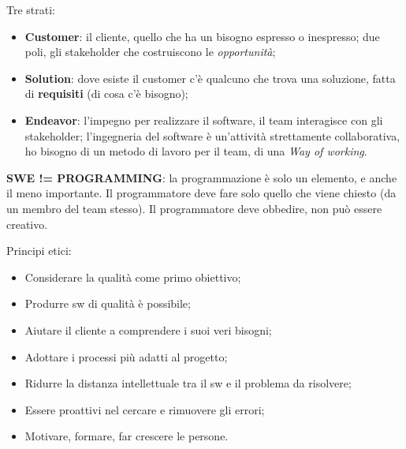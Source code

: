Tre strati:

\begin{itemize}

	\item \textbf{Customer}: il cliente, quello che ha un bisogno espresso o inespresso; due poli, gli stakeholder che costruiscono le \textit{opportunità};
	\item \textbf{Solution}: dove esiste il customer c'è qualcuno che trova una soluzione, fatta di \textbf{requisiti} (di cosa c'è bisogno);
	\item \textbf{Endeavor}: l'impegno per realizzare il software, il team interagisce con gli stakeholder; l'ingegneria del software è un'attività strettamente collaborativa, ho bisogno di un metodo di lavoro per il team, di una \textit{Way of working}.

\end{itemize}

\textbf{SWE != PROGRAMMING}: la programmazione è solo un elemento, e anche il meno importante. Il programmatore deve fare solo quello che viene chiesto (da un membro del team stesso). Il programmatore deve obbedire, non può essere creativo.

Principi etici:

\begin{itemize}

	\item Considerare la qualità come primo obiettivo;
	\item Produrre sw di qualità è possibile;
	\item Aiutare il cliente a comprendere i suoi veri bisogni;
	\item Adottare i processi più adatti al progetto;
	\item Ridurre la distanza intellettuale tra il sw e il problema da risolvere;
	\item Essere proattivi nel cercare e rimuovere gli errori;
	\item Motivare, formare, far crescere le persone.

\end{itemize}


